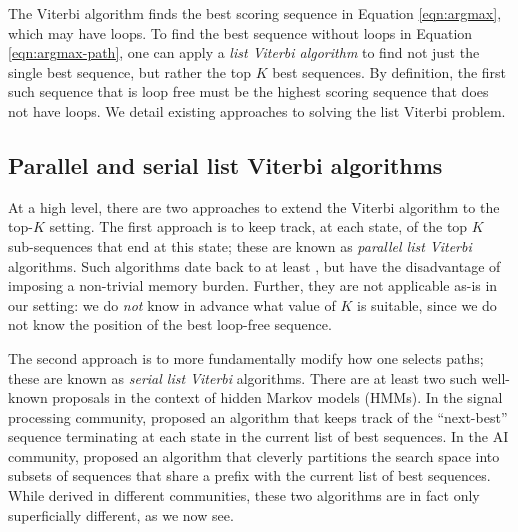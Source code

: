 

The Viterbi algorithm %
finds the best scoring sequence in Equation \ref{eqn:argmax}, which may have loops.
To find the best sequence without loops in Equation \ref{eqn:argmax-path}, one can apply a \emph{list Viterbi algorithm}
to find not just the single best sequence,
but rather the top $K$ best sequences.
By definition, the first such sequence that is loop free must be the highest scoring sequence that does not have loops.
We detail existing approaches to solving the list Viterbi problem.

%
\subsection{Parallel and serial list Viterbi algorithms}

At a high level, there are two approaches to extend the Viterbi algorithm to the top-$K$ setting.
The first approach is to keep track, at each state, of the top $K$ sub-sequences that end at this state; these are known as \emph{parallel list Viterbi} algorithms.
Such algorithms date back to at least \citet{Forney:1973},
but have the disadvantage of imposing a non-trivial memory burden.
Further, they are not applicable as-is in our setting:
we do \emph{not} know in advance what value of $K$ is suitable,
since we do not know the position of the best loop-free sequence.

The second approach is to more fundamentally modify how one selects paths; these are known as \emph{serial list Viterbi} algorithms.
There are at least two such well-known proposals in the context of hidden Markov models (HMMs).
In the signal processing community, \citet{seshadri1994list} proposed an algorithm that keeps track of the ``next-best'' sequence terminating at each state in the current list of best sequences.
In the AI community, \citet{nilsson2001sequentially}
proposed an algorithm that cleverly partitions the search space into subsets of sequences that share a prefix with the current list of best sequences.
While derived in different communities, these two algorithms are in fact only superficially different, as we now see.

